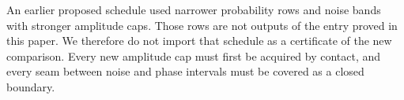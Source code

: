 An earlier proposed schedule used narrower probability rows and noise
bands with stronger amplitude caps. Those rows are not outputs of the
entry proved in this paper. We therefore do not import that schedule as
a certificate of the new comparison. Every new amplitude cap must first
be acquired by contact, and every seam between noise and phase intervals
must be covered as a closed boundary.
